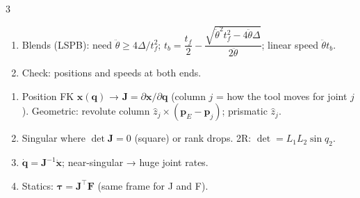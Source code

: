 \begin{multicols}{3}
\begin{recipe}[7 · Trajectories (W13 Q8, Q9)]
\begin{enumerate}
\item Blends (LSPB): need $\ddot\theta\ge 4\Delta/t_f^2$; $t_b=\dfrac{t_f}2-\dfrac{\sqrt{\ddot\theta^2t_f^2-4\ddot\theta\Delta}}{2\ddot\theta}$; linear speed $\ddot\theta t_b$.
\item Check: positions and speeds at both ends.
\end{enumerate}
\end{recipe}
\begin{recipe}\label{r:jac}
\begin{enumerate}
\item Position FK $\mathbf x(\mathbf q)$ → $\mathbf J=\partial\mathbf x/\partial\mathbf q$ (column $j$ = how the tool moves for joint $j$). Geometric: revolute column $\hat z_j\times(\mathbf p_E-\mathbf p_j)$; prismatic $\hat z_j$.
\item Singular where $\det\mathbf J=0$ (square) or rank drops. 2R: $\det=L_1L_2\sin q_2$.
\item $\dot{\mathbf q}=\mathbf J^{-1}\dot{\mathbf x}$; near-singular → huge joint rates.
\item Statics: $\boldsymbol\tau=\mathbf J^\top\mathbf F$ (same frame for J and F).
\end{enumerate}
\end{recipe}


\end{multicols}
